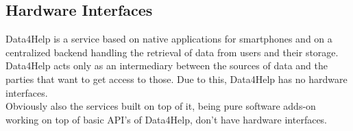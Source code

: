 \documentclass[../../../rasd.tex]{subfiles}
\begin{document}
\subsection{Hardware Interfaces}
			Data4Help is a service based on native applications for smartphones and on a centralized backend handling the retrieval of data from users and their storage. Data4Help acts only as an intermediary between the sources of data and the parties that want to get access to those. Due to this, Data4Help has no hardware interfaces.\\
			Obviously also the services built on top of it, being pure software adds-on working on top of basic API's of Data4Help, don't have hardware interfaces.
\end{document}
